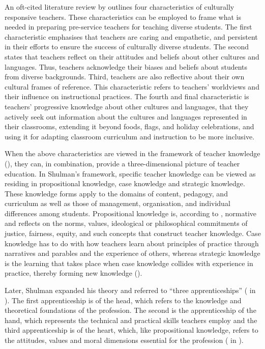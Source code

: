\documentclass[output=paper]{langscibook}
\begin{document}
An oft-cited literature review by \citet{RychlyGraves2012} outlines four characteristics of culturally responsive teachers. These characteristics can be employed to frame what is needed in preparing pre-service teachers for teaching diverse students. The first characteristic emphasises that teachers are caring and empathetic, and persistent in their efforts to ensure the success of culturally diverse students. The second states that teachers reflect on their attitudes and beliefs about other cultures and languages. Thus, teachers acknowledge their biases and beliefs about students from diverse backgrounds. Third, teachers are also reflective about their own cultural frames of reference. This characteristic refers to teachers’ worldviews and their influence on instructional practices. The fourth and final characteristic is teachers’ progressive knowledge about other cultures and languages, that they actively seek out information about the cultures and languages represented in their classrooms, extending it beyond foods, flags, and holiday celebrations, and using it for adapting classroom curriculum and instruction to be more inclusive.

When the above characteristics are viewed in the framework of teacher knowledge (\citealt{Shulman1986}), they can, in combination, provide a three-dimensional picture of teacher education. In Shulman’s framework, specific teacher knowledge can be viewed as residing in propositional knowledge, case knowledge and strategic knowledge. These knowledge forms apply to the domains of content, pedagogy, and curriculum as well as those of management, organisation, and individual differences among students. Propositional knowledge is, according to \citet{Shulman1986}, normative and reflects on the norms, values, ideological or philosophical commitments of justice, fairness, equity, and such concepts that construct teacher knowledge. Case knowledge has to do with how teachers learn about principles of practice through narratives and parables and the experience of others, whereas strategic knowledge is the learning that takes place when case knowledge collides with experience in practice, thereby forming new knowledge (\citealt{Shulman1986}).

Later, Shulman expanded his theory and referred to “three apprenticeships” (\citealt{Shulman2007} in \citealt[192]{FlorianRouse2010}). The first apprenticeship is of the head, which refers to the knowledge and theoretical foundations of the profession. The second is the apprenticeship of the hand, which represents the technical and practical skills teachers employ and the third apprenticeship is of the heart, which, like propositional knowledge, refers to the attitudes, values and moral dimensions essential for the profession (\citealt{Shulman2007} in \citealt[192]{FlorianRouse2010}).
\end{document}
